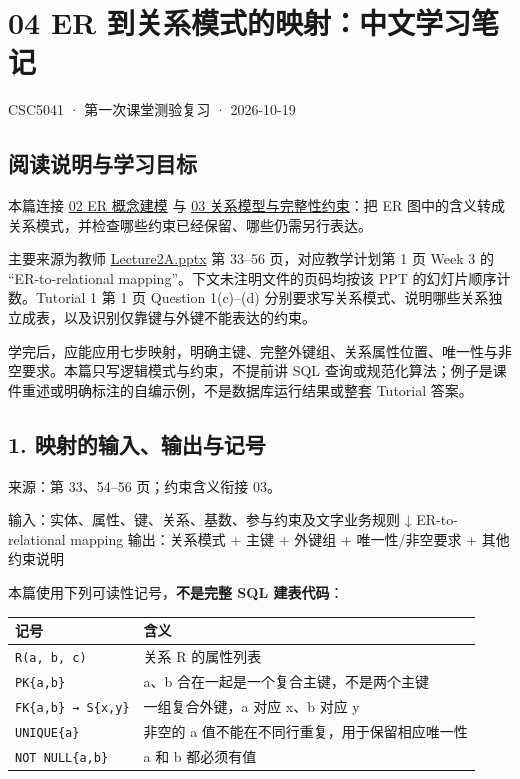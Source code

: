\clearpage
\section{04 ER 到关系模式的映射：中文学习笔记}\label{04_er_to_relational_mapping_zh}

CSC5041 · 第一次课堂测验复习 · 2026-10-19

\subsection{阅读说明与学习目标}\label{04_er_to_relational_mapping_zh-ux9605ux8bfbux8bf4ux660eux4e0eux5b66ux4e60ux76eeux6807}

本篇连接 \hyperref[02_er_modelling_zh]{02 ER 概念建模} 与 \hyperref[03_relational_model_and_integrity_zh]{03 关系模型与完整性约束}：把 ER 图中的含义转成关系模式，并检查哪些约束已经保留、哪些仍需另行表达。

主要来源为教师 \href{../../../slides/Lecture2A.pptx}{Lecture2A.pptx} 第 33--56 页，对应教学计划第 1 页 Week 3 的 ``ER-to-relational mapping''。下文未注明文件的页码均按该 PPT 的幻灯片顺序计数。Tutorial 1 第 1 页 Question 1(c)--(d) 分别要求写关系模式、说明哪些关系独立成表，以及识别仅靠键与外键不能表达的约束。

学完后，应能应用七步映射，明确主键、完整外键组、关系属性位置、唯一性与非空要求。本篇只写逻辑模式与约束，不提前讲 SQL 查询或规范化算法；例子是课件重述或明确标注的自编示例，不是数据库运行结果或整套 Tutorial 答案。

\subsection{1. 映射的输入、输出与记号}\label{04_er_to_relational_mapping_zh-ux6620ux5c04ux7684ux8f93ux5165ux8f93ux51faux4e0eux8bb0ux53f7}

来源：第 33、54--56 页；约束含义衔接 03。

\begin{StudyCode}
输入：实体、属性、键、关系、基数、参与约束及文字业务规则
  ↓ ER-to-relational mapping
输出：关系模式 + 主键 + 外键组 + 唯一性/非空要求 + 其他约束说明
\end{StudyCode}

本篇使用下列可读性记号，\textbf{不是完整 SQL 建表代码}：

\begin{longtable}[]{@{}ll@{}}
\toprule\noalign{}
记号 & 含义 \\
\midrule\noalign{}
\endhead
\bottomrule\noalign{}
\endlastfoot
\texttt{R(\allowbreak{}a,\allowbreak{}\ b,\allowbreak{}\ c)\allowbreak{}} & 关系 R 的属性列表 \\
\texttt{PK\{a,b\}} & a、b 合在一起是一个复合主键，不是两个主键 \\
\texttt{FK\{a,b\}\ →\ S\{x,y\}} & 一组复合外键，a 对应 x、b 对应 y \\
\texttt{UNIQUE\{a\}} & 非空的 a 值不能在不同行重复，用于保留相应唯一性 \\
\texttt{NOT\ NULL\{a,b\}} & a 和 b 都必须有值 \\
\end{longtable}

